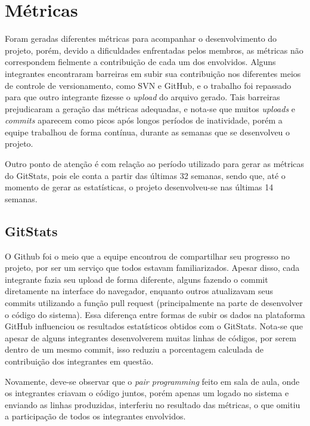\documentclass[
    12pt,               %
    openright,          %
    oneside,
    a4paper,            %
    BIBLATEX,           %
    TODO,               %
    english,            %
    brazil              %
    ]{ifsp-spo-inf-ctds}
\begin{document}
\section{Métricas}

    Foram geradas diferentes métricas para acompanhar o desenvolvimento do projeto, porém, devido a dificuldades enfrentadas pelos membros, as métricas não correspondem fielmente a contribuição de cada um dos envolvidos. Alguns integrantes encontraram barreiras em subir sua contribuição nos diferentes meios de controle de versionamento, como SVN e GitHub, e o trabalho foi repassado para que outro integrante fizesse o \emph{upload} do arquivo gerado.
    Tais barreiras prejudicaram a geração das métricas adequadas, e nota-se que muitos \emph{uploads} e \emph{commits} aparecem como picos após longos períodos de inatividade, porém a equipe trabalhou de forma contínua, durante as semanas que se desenvolveu o projeto. 
    
    Outro ponto de atenção é com relação ao período utilizado para gerar as métricas do GitStats, pois ele conta a partir das últimas 32 semanas, sendo que, até o momento de gerar as estatísticas, o projeto desenvolveu-se nas últimas 14 semanas.
    
    \subsection{GitStats}
    
    O Github foi o meio que a equipe encontrou de compartilhar seu progresso no projeto, por ser um serviço que todos estavam familiarizados. Apesar disso, cada integrante fazia seu upload de forma diferente, alguns fazendo o commit diretamente na interface do navegador, enquanto outros atualizavam seus commits utilizando a função pull request (principalmente na parte de desenvolver o código do sistema). Essa diferença entre formas de subir os dados na plataforma GitHub influenciou os resultados estatísticos obtidos com o GitStats. Nota-se que apesar de alguns integrantes desenvolverem muitas linhas de códigos, por serem dentro de um mesmo commit, isso reduziu a porcentagem calculada de contribuição dos integrantes em questão. 
    
    Novamente, deve-se observar que o \emph{pair programming} feito em sala de aula, onde os integrantes criavam o código juntos, porém apenas um logado no sistema e enviando as linhas produzidas, interferiu no resultado das métricas, o que omitiu a participação de todos os integrantes envolvidos.
    
\end{document}
